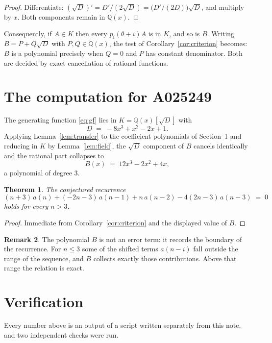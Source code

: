 \documentclass[11pt,a4paper]{article}
\theoremstyle{plain}
\newtheorem{theorem}{Theorem}
\theoremstyle{definition}
\newtheorem{remark}[theorem]{Remark}
\begin{document}
\begin{proof}
Differentiate: $(\sqrt{D})'=D'/(2\sqrt{D})=\bigl(D'/(2D)\bigr)\sqrt{D}$, and multiply by
$x$. Both components remain in $\mathbb{Q}(x)$.
\end{proof}

Consequently, if $A\in K$ then every $p_{i}(\theta+i)A$ is in $K$, and so is $B$. Writing
$B=P+Q\sqrt{D}$ with $P,Q\in\mathbb{Q}(x)$, the test of Corollary~\ref{cor:criterion}
becomes: $B$ is a polynomial precisely when $Q=0$ and $P$ has constant denominator. Both
are decided by exact cancellation of rational functions.

\section{The computation for A025249}

The generating function \eqref{eq:gf} lies in $K=\mathbb{Q}(x)[\sqrt{D}]$ with
\[
D \;=\; - 8 x^{3} + x^{2} - 2 x + 1 .
\]
Applying Lemma~\ref{lem:transfer} to the coefficient polynomials of Section~1 and reducing
in $K$ by Lemma~\ref{lem:field}, the $\sqrt{D}$ component of $B$ cancels identically and
the rational part collapses to
\[
B(x)\;=\;12 x^{3} - 2 x^{2} + 4 x ,
\]
a polynomial of degree $3$.

\begin{theorem}
The conjectured recurrence
\[
(n + 3)\,a(n) + (- 2 n - 3)\,a(n-1) + n\,a(n-2) -  4 \left(2 n - 3\right)\,a(n-3) \;=\;0
\]
holds for every $n>3$.
\end{theorem}

\begin{proof}
Immediate from Corollary~\ref{cor:criterion} and the displayed value of $B$.
\end{proof}

\begin{remark}
The polynomial $B$ is not an error term: it records the boundary of the recurrence. For
$n\le3$ some of the shifted terms $a(n-i)$ fall outside the range of the sequence,
and $B$ collects exactly those contributions. Above that range the relation is exact.
\end{remark}

\section{Verification}

Every number above is an output of a script written separately from this note, and two
independent checks were run.
\end{document}
